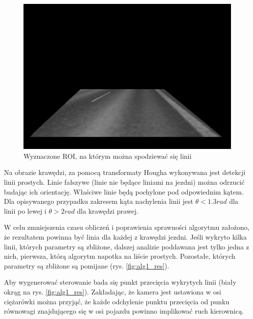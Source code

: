 \begin{figure}
  \centering
  \includegraphics[width=13cm]{img/alg1_roi.jpg}
  \caption{Wyznaczone ROI, na którym można spodziewać się linii}
  \label{fig:alg1_roi}
\end{figure}

Na obrazie krawędzi, za pomocą transformaty Hougha wykonywana jest detekcji linii prostych. 
Linie fałszywe (linie nie będące liniami na jezdni) można odrzucić badając ich orientację. %
Właściwe linie będą pochylone pod odpowiednim kątem. 
Dla opisywanego przypadku zakresem kąta nachylenia linii jest $\theta < 1.3rad$ dla linii po lewej i $\theta > 2rad$ dla krawędzi prawej. %

W celu zmniejszenia czasu obliczeń i poprawienia sprawności algorytmu założono, że rezultatem powinna być linia dla każdej z krawędzi jezdni. Jeśli wykryto kilka linii, których parametry są zbliżone, dalszej analizie poddawana jest tylko jedna z nich, pierwsza, którą algorytm napotka na liście prostych. Pozostałe, których parametry są zbliżone są pomijane (rys. \ref{fig:alg1_res}).

Aby wygenerować sterowanie bada się punkt przecięcia wykrytych linii (biały okrąg na rys. \ref{fig:alg1_res}). Zakładając, że kamera jest ustawiona w osi ciężarówki można przyjąć, że każde odchylenie punktu przecięcia od punku równowagi znajdującego się w osi pojazdu powinno implikować ruch kierownicą.

